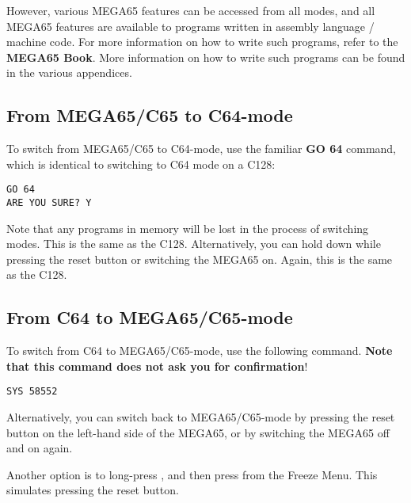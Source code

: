However, various MEGA65 features can be accessed from all modes, and all MEGA65 features are available
to programs written in assembly language / machine code.
\ifdefined\printmanual
For more information on how to write such programs, refer to the {\bf MEGA65 Book}.
\else
More information on how to write such programs can be found in the various appendices.
\fi

\subsection{From MEGA65/C65 to C64-mode}

To switch from MEGA65/C65 to C64-mode, use the familiar {\bf GO 64} command, which is identical to switching to C64
mode on a C128:
\begin{tcolorbox}[colback=black,coltext=white]
\verbatimfont{\codefont}
\begin{verbatim}
GO 64
ARE YOU SURE? Y
\end{verbatim}
\end{tcolorbox}

Note that any programs in memory will be lost in the process of switching modes. This is the same as the C128.
Alternatively, you can hold \megasymbolkey down while pressing the reset button or switching the MEGA65 on. Again,
this is the same as the C128.

\subsection{From C64 to MEGA65/C65-mode}

To switch from C64 to MEGA65/C65-mode, use the following command. {\bf Note that this command does not ask you for
confirmation}!

\begin{tcolorbox}[colback=black,coltext=white]
\verbatimfont{\codefont}
\begin{verbatim}
SYS 58552
\end{verbatim}
\end{tcolorbox}

Alternatively, you can switch back to MEGA65/C65-mode by pressing the reset
button on the left-hand side of the MEGA65, or by switching the
MEGA65 off and on again.

Another option is to long-press , and then press 
from the Freeze Menu.  This simulates pressing the reset button.

